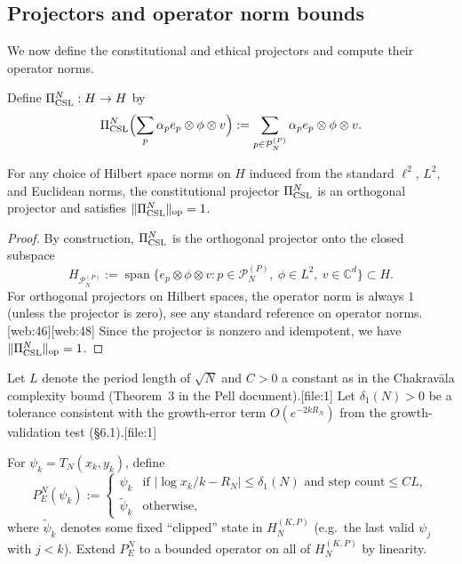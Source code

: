 \documentclass[11pt]{article}
\begin{document}
\subsection{Projectors and operator norm bounds}
\label{app:projectors-bounds}

We now define the constitutional and ethical projectors and compute
their operator norms.

\begin{definition}
Define \(\Pi_{\rm CSL}^N: H \to H\) by
\[
\Pi_{\rm CSL}^N \Bigl(\sum_{p} \alpha_p e_p \otimes \phi \otimes v\Bigr)
:= \sum_{p \in \mathcal{P}_N^{(P)}}
   \alpha_p e_p \otimes \phi \otimes v.
\]
\end{definition}

\begin{lemma}
\label{lem:Pi-norm}
For any choice of Hilbert space norms on \(H\) induced from the standard
\(\ell^2\), \(L^2\), and Euclidean norms, the constitutional projector
\(\Pi_{\rm CSL}^N\) is an orthogonal projector and satisfies
\(\|\Pi_{\rm CSL}^N\|_{\text{op}} = 1\).
\end{lemma}

\begin{proof}
By construction, \(\Pi_{\rm CSL}^N\) is the orthogonal projector onto
the closed subspace
\[
H_{\mathcal{P}_N^{(P)}} :=
\operatorname{span}\{e_p \otimes \phi \otimes v :
                     p\in\mathcal{P}_N^{(P)},\ \phi\in L^2,\ v\in\mathbb{C}^d\}
\subset H.
\]
For orthogonal projectors on Hilbert spaces, the operator norm is always
\(1\) (unless the projector is zero), see any standard reference on
operator norms.[web:46][web:48] Since the projector is nonzero and
idempotent, we have \(\|\Pi_{\rm CSL}^N\|_{\text{op}} = 1\).
\end{proof}

\begin{definition}
Let \(L\) denote the period length of \(\sqrt{N}\) and \(C>0\) a
constant as in the Chakrav\=ala complexity bound (Theorem~3 in the Pell
document).[file:1]
Let \(\delta_1(N)>0\) be a tolerance consistent with the growth-error
term \(O(e^{-2k R_N})\) from the growth-validation test (§6.1).[file:1]

For \(\psi_k = T_N(x_k,y_k)\), define
\[
P_E^N(\psi_k) :=
\begin{cases}
\psi_k & \text{if } |\log x_k/k - R_N| \le \delta_1(N)
         \text{ and step count} \le C L,\\
\widetilde{\psi}_k & \text{otherwise},
\end{cases}
\]
where \(\widetilde{\psi}_k\) denotes some fixed ``clipped'' state in
\(H_N^{(K,P)}\) (e.g.\ the last valid \(\psi_j\) with \(j<k\)).
Extend \(P_E^N\) to a bounded operator on all of \(H_N^{(K,P)}\) by linearity.
\end{definition}
\end{document}
